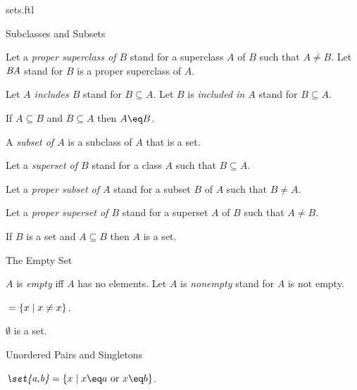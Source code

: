 \documentclass{naproche-library}
\begin{document}
\begin{smodule}[title=Classes and Sets]{sets.ftl}
\begin{sfragment}{Subclasses and Subsets}
\begin{definition*}[forthel,id=SubclassDef]
    Let a \emph{proper superclass of $B$} stand for a superclass $A$ of $B$ such that $A \neq B$.
    Let $\emph{B\supsetneq A}$ stand for $B$ is a proper superclass of $A$.

    Let \emph{$A$ includes $B$} stand for $B\subseteq A$.
    Let $B$ is \emph{included in $A$} stand for $B\subseteq A$.
  \end{definition*}

  \begin{axiom*}[forthel,title=Class Extensionality Axiom,id=ClassExtensionalityAx]
    If $A\subseteq B$ and $B\subseteq A$ then $A\eq B$.
  \end{axiom*}

  \begin{definition*}[forthel,id=SubsetDef]
    A \emph{subset of $A$} is a subclass of $A$ that is a set.

    Let a \emph{superset of $B$} stand for a class $A$ such that $B\subseteq A$.

    Let a \emph{proper subset of $A$} stand for a subset $B$ of $A$ such that $B\neq A$.

    Let a \emph{proper superset of $B$} stand for a superset $A$ of $B$ such that $A \neq B$.
  \end{definition*}

  \begin{axiom*}[forthel,title=Separation Axiom,id=SeparationAx]
    If $B$ is a set and $A\subseteq B$ then $A$ is a set.
  \end{axiom*}
\end{sfragment}

\begin{sfragment}{The Empty Set}
  \begin{definition*}[forthel,id=EmptyDef]
    $A$ is \emph{empty} iff $A$ has no elements.
    Let $A$ is \emph{nonempty} stand for $A$ is not empty.
  \end{definition*}

  \begin{definition*}[forthel,id=EmptySetDef]
    $\emph{\emptyset}=\{x\mid x\neq x\}$.
  \end{definition*}

  \begin{axiom*}[forthel,title=Empty Set Axiom,id=EmptySetAx]
    $\emptyset$ is a set.
  \end{axiom*}
\end{sfragment}

\begin{sfragment}{Unordered Pairs and Singletons}
  \begin{definition*}[forthel,id=UnorderedPairDef]
    $\emph{\set{a,b}}=\{x\mid x\eq a\text{ or }x\eq b\}$.
  \end{definition*}


\end{sfragment}
\end{smodule}
\end{document}
